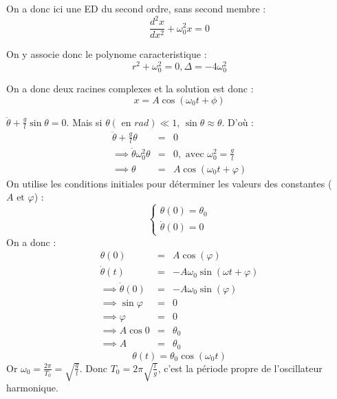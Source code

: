 On a donc ici une ED du second ordre, sans second membre : 
\[
    \frac{d^{2}x}{dx^{2}} + \omega_{\text{0}}^{2}x = 0
\]

On y associe donc le polynome caracteristique : 
\[
    r^{2} + \omega_{\text{0}}^{2} = 0, \Delta = -4\omega_{\text{0}}^{2}
\]

On a donc deux racines complexes et la solution est donc : 
\[
    \boxed{x = A\cos\left( \omega_{\text{0}}t + \phi \right)}
\]

\begin{eg}
    \(\ddot{\theta} + \frac{g}{l}\sin \theta = 0\). Mais si \(\theta (\text{ en } \unit{rad}) \ll 1\), \(\sin \theta \approx \theta\). D'où : 
    \begin{eqnarray*}
        \ddot{\theta} + \frac{g}{l}\theta &=& 0 \\
        \implies \ddot{\theta} \omega_{\text{0}}^{2}\theta &=& 0, \text{ avec } \omega_{\text{0}}^{2} = \frac{g}{l} \\
        \implies \theta &=& A \cos\left( \omega_{\text{0}}t + \varphi \right)
    \end{eqnarray*}
    On utilise les conditions initiales pour déterminer les valeurs des constantes (\(A \text{ et } \varphi\)) : 
    \[
        \begin{cases}
            \theta(0) = \theta_{\text{0}} \\
            \dot{\theta}(0) = 0
        \end{cases}
    \]
    On a donc : 
    \begin{eqnarray*}
        \theta(0) &=& A \cos \left( \varphi \right) \\
        \dot{\theta}(t) &=& -A \omega_{\text{0}}\sin \left( \omega t +\varphi \right)\\
        \implies \dot{\theta}(0) &=& -A\omega_{\text{0}}\sin \left( \varphi \right) \\
        \implies \sin \varphi &=& 0 \\
        \implies \varphi &=& 0 \\
        \implies A\cos 0 &=& \theta_{\text{0}} \\
        \implies A &=& \theta_{\text{0}}
    \end{eqnarray*}
    \[
        \boxed{\theta(t) = \theta_{\text{0}} \cos(\omega_{\text{0}} t)}
    \]
    Or \(\omega_{\text{0}} = \frac{2\pi}{T_{0}} = \sqrt{\frac{g}{l}}\). 
    Donc \(\boxed{T_{0} = 2\pi\sqrt{\frac{l}{g}}}\), c'est la période propre de l'oscillateur harmonique.  
\end{eg}
